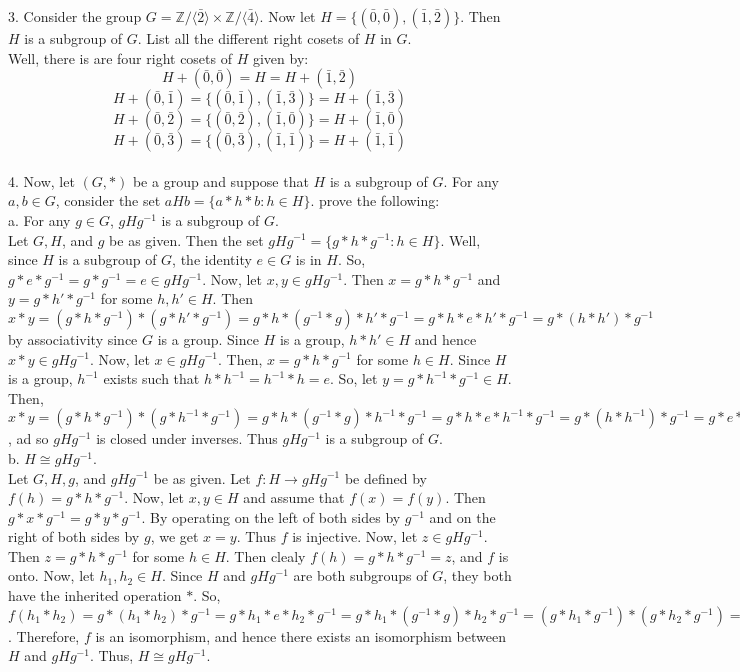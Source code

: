 \documentclass[12pt]{article}
\begin{document}
3. Consider the group $G=\mathbb{Z}/\langle\bar{2}\rangle\times\mathbb{Z}/\langle\bar{4}\rangle$. Now let $H=\{(\bar{0},\bar{0}), (\bar{1},\bar{2})\}$. Then $H$ is a subgroup of $G$. List all the different right cosets of $H$ in $G$.\\
Well, there is  are four right cosets of $H$ given by:$$H+(\bar{0},\bar{0})=H=H+(\bar{1},\bar{2})$$ $$H+(\bar{0},\bar{1})=\{(\bar{0},\bar{1}),(\bar{1},\bar{3})\}=H+(\bar{1},\bar{3})$$ $$H+(\bar{0},\bar{2})=\{(\bar{0},\bar{2}),(\bar{1},\bar{0})\}=H+(\bar{1},\bar{0})$$ $$H+(\bar{0},\bar{3})=\{(\bar{0},\bar{3}),(\bar{1},\bar{1})\}=H+(\bar{1},\bar{1})$$\\[20pt]

4. Now, let $(G,*)$ be a group and suppose that $H$ is a subgroup of $G$. For any $a,b\in G$, consider the set $aHb=\{a*h*b:h\in H\}$. prove the following:\\
a. For any $g\in G$, $gHg^{-1}$ is a subgroup of $G$.\\
Let $G, H$, and $g$ be as given. Then the set $gHg^{-1}=\{g*h*g^{-1}:h\in H\}$. Well, since $H$ is a subgroup of $G$, the identity $e\in G$ is in $H$. So, $g*e*g^{-1}=g*g^{-1}=e\in gHg^{-1}$. Now, let $x,y\in gHg^{-1}$. Then $x=g*h*g^{-1}$ and $y=g*h'*g^{-1}$ for some $h,h'\in H$. Then $x*y=(g*h*g^{-1})*(g*h'*g^{-1})=g*h*(g^{-1}*g)*h'*g^{-1}=g*h*e*h'*g^{-1}=g*(h*h')*g^{-1}$ by associativity since $G$ is a group. Since $H$ is a group, $h*h'\in H$ and hence $x*y\in gHg^{-1}$. Now, let $x\in gHg^{-1}.$ Then, $x=g*h*g^{-1}$ for some $h\in H$. Since $H$ is a group, $h^{-1}$ exists such that $h*h^{-1}=h^{-1}*h=e$. So, let $y=g*h^{-1}*g^{-1}\in H$. Then, $x*y=(g*h*g^{-1})*(g*h^{-1}*g^{-1})=g*h*(g^{-1}*g)*h^{-1}*g^{-1}=g*h*e*h^{-1}*g^{-1}=g*(h*h^{-1})*g^{-1}=g*e*g^{-1}=g*g^{-1}=e=g*g^{-1}=g*e*g^{-1}=g*(h^{-1}*h)*g^{-1}=g*h^{-1}*e*h*g^{-1}=g*h^{-1}*(g^{-1}*g)*h*g^{-1}=(g*h^{-1}*g^{-1})*(g*h*g^{-1})=y*x$, ad so $gHg^{-1}$ is closed under inverses. Thus $gHg^{-1}$ is a subgroup of $G$.\\
b. $H\cong gHg^{-1}$.\\
Let $G, H, g$, and $gHg^{-1}$ be as given. Let $f:H\rightarrow gHg^{-1}$ be defined by $f(h)=g*h*g^{-1}$. Now, let $x,y\in H$ and assume that $f(x)=f(y)$. Then $g*x*g^{-1}=g*y*g^{-1}$. By operating on the left of both sides by $g^{-1}$ and on the right of both sides by $g$, we get $x=y$. Thus $f$ is injective. Now, let $z\in gHg^{-1}$. Then $z=g*h*g^{-1}$ for some $h\in H$. Then clealy $f(h)=g*h*g^{-1}=z$, and $f$ is onto. Now, let $h_1,h_2\in H$. Since $H$ and $gHg^{-1}$ are both subgroups of $G$, they both have the inherited operation $*$. So, $f(h_1*h_2)=g*(h_1*h_2)*g^{-1}=g*h_1*e*h_2*g^{-1}=g*h_1*(g^{-1}*g)*h_2*g^{-1}=(g*h_1*g^{-1})*(g*h_2*g^{-1})=f(h_1)*f(h_2)$. Therefore, $f$ is an isomorphism, and hence there exists an isomorphism between $H$ and $gHg^{-1}$. Thus, $H\cong gHg^{-1}$.
\end{document}
